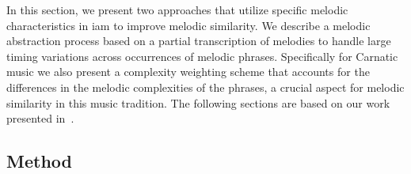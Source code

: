 In this section, we present two approaches that utilize specific melodic characteristics in \gls{iam} to improve melodic similarity. We describe a melodic abstraction process based on a partial transcription of melodies to handle large timing variations across occurrences of melodic phrases. Specifically for Carnatic music we also present a complexity weighting scheme that accounts for the differences in the melodic complexities of the phrases, a crucial aspect for melodic similarity in this music tradition. The following sections are based on our work presented in~\cite{gulati_ISMIR_2015}.



\subsection{Method}
\label{sec:patterns_improving_similarity_method}

